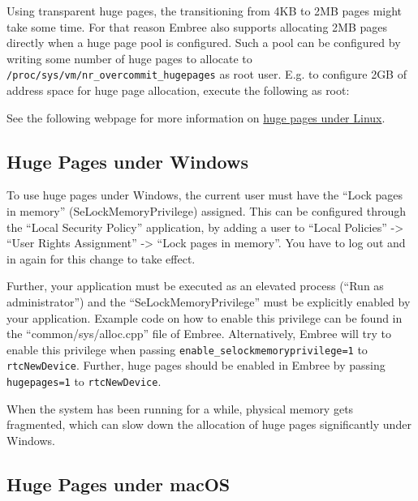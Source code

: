Using transparent huge pages, the transitioning from 4KB to 2MB pages
might take some time. For that reason Embree also supports allocating
2MB pages directly when a huge page pool is configured. Such a pool can
be configured by writing some number of huge pages to allocate to
\texttt{/proc/sys/vm/nr\_overcommit\_hugepages} as root user. E.g. to
configure 2GB of address space for huge page allocation, execute the
following as root:

\begin{Shaded}
\begin{Highlighting}[]
 \OperatorTok{\textgreater{}} \OperatorTok{/}\OperatorTok{/}\OperatorTok{/}\OperatorTok{/}
\end{Highlighting}
\end{Shaded}

See the following webpage for more information on
\href{https://www.kernel.org/doc/Documentation/vm/hugetlbpage.txt}{huge
pages under Linux}.

\subsection{Huge Pages under Windows}\label{huge-pages-under-windows}

To use huge pages under Windows, the current user must have the ``Lock
pages in memory'' (SeLockMemoryPrivilege) assigned. This can be
configured through the ``Local Security Policy'' application, by adding
a user to ``Local Policies'' -\textgreater{} ``User Rights Assignment''
-\textgreater{} ``Lock pages in memory''. You have to log out and in
again for this change to take effect.

Further, your application must be executed as an elevated process (``Run
as administrator'') and the ``SeLockMemoryPrivilege'' must be explicitly
enabled by your application. Example code on how to enable this
privilege can be found in the ``common/sys/alloc.cpp'' file of Embree.
Alternatively, Embree will try to enable this privilege when passing
\texttt{enable\_selockmemoryprivilege=1} to \texttt{rtcNewDevice}.
Further, huge pages should be enabled in Embree by passing
\texttt{hugepages=1} to \texttt{rtcNewDevice}.

When the system has been running for a while, physical memory gets
fragmented, which can slow down the allocation of huge pages
significantly under Windows.

\subsection{Huge Pages under macOS}\label{huge-pages-under-macos}

